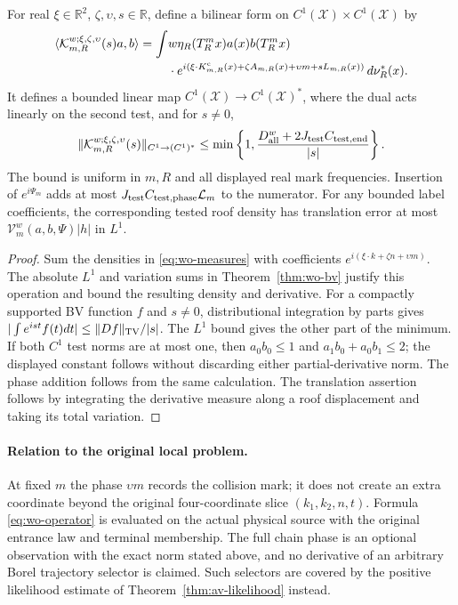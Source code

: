 \begin{corollary}
\label{cor:wo-fourier}
For real $\xi\in\mathbb R^2$, $\zeta,\upsilon,s\in\mathbb R$,
define a bilinear form on $C^1(\mathcal X)\times C^1(\mathcal X)$ by
\begin{equation}\label{eq:wo-operator}
 \begin{split}
 \langle\mathcal K_{m,R}^{w;\xi,\zeta,\upsilon}(s)a,b\rangle
 =\int &w\eta_R(T_R^mx)a(x)b(T_R^mx)\\
 &\cdot e^{i(\xi\cdot K^{\rm c}_{m,R}(x)+
       \zeta A_{m,R}(x)+\upsilon m+sL_{m,R}(x))}
          \,d\nu_R^*(x).
 \end{split}
\end{equation}
It defines a bounded linear map $C^1(\mathcal X)\to C^1(\mathcal X)^*$,
where the dual acts linearly on the second test, and for $s\ne0$,
\begin{equation}\label{eq:wo-weak-bound}
 \|\mathcal K_{m,R}^{w;\xi,\zeta,\upsilon}(s)\|_{C^1\to(C^1)^*}
 \le\min\left\{1,
       \frac{D_{\rm all}^w+2J_{\rm test}C_{\rm test,end}}{|s|}\right\}.
\end{equation}
The bound is uniform in $m,R$ and all displayed real mark
frequencies.  Insertion of $e^{i\Psi_m}$ adds at most
$J_{\rm test}C_{\rm test,phase}\mathcal L_m$ to the numerator.
For any bounded label coefficients, the corresponding tested
roof density has translation error at most
$\mathcal V_m^w(a,b,\Psi)|h|$ in $L^1$.
\end{corollary}
\begin{proof}
Sum the densities in \eqref{eq:wo-measures} with coefficients
$e^{i(\xi\cdot k+\zeta n+\upsilon m)}$.  The absolute $L^1$
and variation sums in Theorem~\ref{thm:wo-bv} justify this
operation and bound the resulting density and derivative.
For a compactly supported BV function $f$ and $s\ne0$,
distributional integration by parts gives
$|\int e^{ist}f(t)dt|\le\|Df\|_{\rm TV}/|s|$.
The $L^1$ bound gives the other part of the minimum.
If both $C^1$ test norms are at most one, then
$a_0b_0\le1$ and $a_1b_0+a_0b_1\le2$; the displayed
constant follows without discarding either partial-derivative
norm.  The phase addition follows from the same calculation.
The translation assertion follows by integrating the derivative
measure along a roof displacement and taking its total variation.
\end{proof}

\paragraph{Relation to the original local problem.}
At fixed $m$ the phase $\upsilon m$ records the collision mark;
it does not create an extra coordinate beyond the original
four-coordinate slice $(k_1,k_2,n,t)$.  Formula
\eqref{eq:wo-operator} is evaluated on the actual physical
source with the original entrance law and terminal membership.
The full chain phase is an optional observation with the exact
norm stated above, and no derivative of an arbitrary Borel
trajectory selector is claimed.  Such selectors are covered
by the positive likelihood estimate of
Theorem~\ref{thm:av-likelihood} instead.

